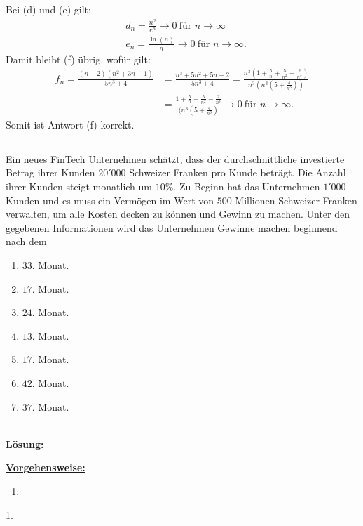 Bei (d) und (e) gilt:
\begin{align*}
	&d_n = \frac{n^2}{ e^n} \to 0  \ \textrm{für } n \to \infty\\
	&e_n = \frac{\ln(n)}{n} \to 0 \ \textrm{für } n \to \infty.
\end{align*}
Damit bleibt (f) übrig, wofür gilt:
\begin{align*}
	f_n = \frac{(n+2) (n^2 + 3n -1 )}{5n^3 + 4}
	&=
	\frac{n^3 + 5n^2 + 5n - 2}{5n^3 + 4}
	=
	\frac{n^3 \left(1 + \frac{5}{n} + \frac{5}{n^2}  - \frac{2}{n^3}\right)}{n^3 \left(n^3 ( 5 + \frac{4}{n^3}) \right)}\\
	&=
	\frac{1 + \frac{5}{n} + \frac{5}{n^2}  - \frac{2}{n^3}}{(n^3 ( 5 + \frac{4}{n^3})}
	\to 0 \ \textrm{für } n \to \infty.
\end{align*}
Somit ist Antwort (f) korrekt.
\newpage

\subsection*{}
Ein neues FinTech Unternehmen schätzt, dass der durchschnittliche investierte Betrag ihrer Kunden $20'000$ Schweizer Franken pro Kunde beträgt.
Die Anzahl ihrer Kunden steigt monatlich um $10 \% $. Zu Beginn hat das Unternehmen $1'000$ Kunden und es muss ein Vermögen im Wert von $500$ Millionen Schweizer Franken verwalten, um alle Kosten decken zu können und Gewinn zu machen.
Unter den gegebenen Informationen wird das Unternehmen Gewinne machen beginnend nach dem
\renewcommand{\labelenumi}{(\alph{enumi})}
\begin{enumerate}
	\item 
	$33$. Monat.
	\item
	$17$. Monat.
	\item
	$24$. Monat.
	\item
	$13$. Monat.
	\item
	$17$. Monat.
	\item
	$42$. Monat.
	\item
	$37$. Monat.
\end{enumerate}
\ \\
\textbf{Lösung:}
\begin{mdframed}
\underline{\textbf{Vorgehensweise:}}
\renewcommand{\labelenumi}{\theenumi.}
\begin{enumerate}
\item 
\end{enumerate}
\end{mdframed}

\underline{1. }\\



